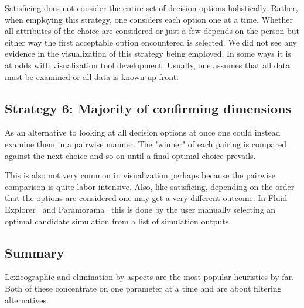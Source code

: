 Satisficing does not consider the entire set of decision options holistically.
Rather, when employing this strategy, one considers each option one at a time.
Whether all attributes of the choice are considered or just a few depends on
the person but either way the first acceptable option encountered is selected.
We did not see any evidence in the visualization  of this strategy being
employed. In some ways it is at odds with visualization tool development.
Usually, one assumes that all data must be examined or all data is known
up-front.

\subsection{Strategy 6: Majority of confirming
dimensions}\label{majority-of-confirming-dimensions}

As an alternative to looking at all decision options at once one could 
instead examine them in a pairwise manner. The "winner" of each pairing is
compared against the next choice and so on until a final optimal choice
prevails.

This is also not very common in visualization perhaps because the pairwise
comparison is quite labor intensive. Also, like satisficing, depending on the
order that the options are considered one may get a very different outcome. In
Fluid Explorer~\cite{Bruckner:2010} and Paramorama~\citep{Pretorius:2011} this
is done by the user manually selecting an optimal candidate simulation from 
a list of simulation outputs.
 

\subsection{Summary}
Lexicographic and elimination by aspects are the most popular heuristics
by far. Both of these concentrate on one parameter at a time and are
about filtering alternatives. 


